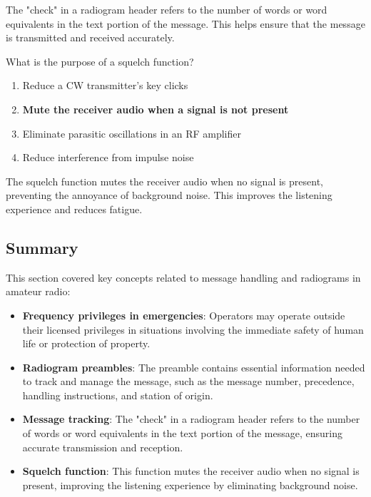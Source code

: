 The "check" in a radiogram header refers to the number of words or word equivalents in the text portion of the message. This helps ensure that the message is transmitted and received accurately.


\begin{tcolorbox}[colback=gray!10!white,colframe=black!75!black,title={T2B13}]
    What is the purpose of a squelch function?
    \begin{enumerate}[label=\Alph*),noitemsep]
        \item Reduce a CW transmitter's key clicks
        \item \textbf{Mute the receiver audio when a signal is not present}
        \item Eliminate parasitic oscillations in an RF amplifier
        \item Reduce interference from impulse noise
    \end{enumerate}
\end{tcolorbox}

The squelch function mutes the receiver audio when no signal is present, preventing the annoyance of background noise. This improves the listening experience and reduces fatigue.


\subsection*{Summary}

This section covered key concepts related to message handling and radiograms in amateur radio:

\begin{itemize}
    \item \textbf{Frequency privileges in emergencies}: Operators may operate outside their licensed privileges in situations involving the immediate safety of human life or protection of property.
    \item \textbf{Radiogram preambles}: The preamble contains essential information needed to track and manage the message, such as the message number, precedence, handling instructions, and station of origin.
    \item \textbf{Message tracking}: The "check" in a radiogram header refers to the number of words or word equivalents in the text portion of the message, ensuring accurate transmission and reception.
    \item \textbf{Squelch function}: This function mutes the receiver audio when no signal is present, improving the listening experience by eliminating background noise.
\end{itemize}
